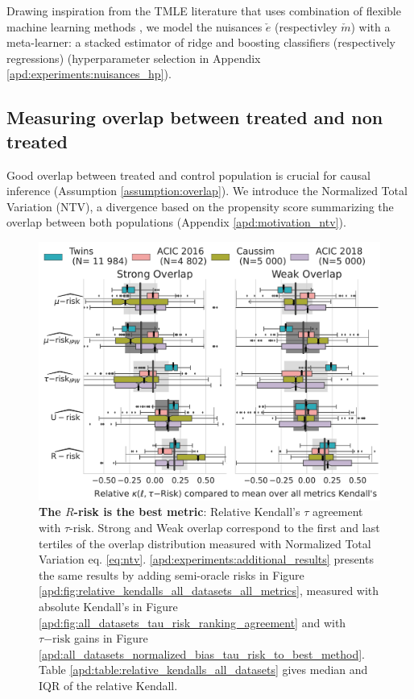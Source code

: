 \documentclass[11pt]{article}
\let\cite=\supercite
\begin{document}
Drawing inspiration from the TMLE literature that uses combination of flexible
machine learning methods \cite{schuler_targeted_2017}, we model the nuisances
$\check e$ (respectivley $\check m$) with a meta-learner: a stacked estimator of ridge
and boosting classifiers (respectively regressions) (hyperparameter selection in Appendix \ref{apd:experiments:nuisances_hp}).


\subsection{Measuring overlap between treated and non treated}\label{subsec:measuring_overlap}

Good overlap between treated and control population is crucial for causal
inference (Assumption \ref{assumption:overlap}). We introduce the
Normalized Total Variation (NTV), a divergence based on the propensity score
summarizing the overlap between both populations (Appendix
\ref{apd:motivation_ntv}).

\begin{figure}[!b]
    \centering\begin{minipage}{.75\linewidth}
    \includegraphics[width=\linewidth]{images/_1_r_risk_domination_r_risk_domination__ref_metric_mean_risks_by_Dataset_feasible_only.pdf}
    \end{minipage}
    \caption{\textbf{The $R$-risk is the best metric}: Relative Kendall's $\tau$ agreement with $\tau\text{-risk}$.
        Strong and Weak overlap correspond to the first and last tertiles of the overlap distribution measured with
        Normalized Total Variation eq. \ref{eq:ntv}. \ref{apd:experiments:additional_results} presents the same results
        by adding semi-oracle risks in Figure \ref{apd:fig:relative_kendalls_all_datasets_all_metrics}, measured with
        absolute Kendall's in Figure \ref{apd:fig:all_datasets_tau_risk_ranking_agreement} and with $\tau\mathrm{-risk}$
        gains in Figure \ref{apd:all_datasets_normalized_bias_tau_risk_to_best_method}. Table
        \ref{apd:table:relative_kendalls_all_datasets} gives median and
        IQR of the relative Kendall.}\label{fig:relative_kendalls_all_datasets}
\end{figure}
\end{document}
